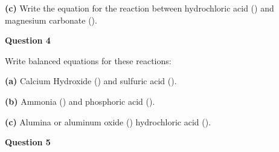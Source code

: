 \documentclass{article}
\begin{document}
{\begin{center}
\textbf{(c)} Write the equation for the reaction between hydrochloric acid () and magnesium carbonate ().

\vspace{0.8cm}
\begin{center}
\end{center}
\vspace{0.2cm}


\pagebreak
\vspace{0.2cm}
\hspace{1cm}
\textbf{Question 4} 
\vspace{0.2cm}

Write balanced equations for these reactions:
\vspace{0.2cm}

\textbf{(a)} Calcium Hydroxide () and sulfuric acid ().

\vspace{0.8cm}
\begin{center}
\end{center}
\vspace{0.2cm}

\textbf{(b)} Ammonia () and phosphoric acid ().

\vspace{0.8cm}
\begin{center}
\end{center}
\vspace{0.2cm}

\textbf{(c)} Alumina or aluminum oxide () hydrochloric acid ().

\vspace{0.8cm}
\begin{center}
\end{center}
\vspace{0.2cm}

\pagebreak
\vspace{0.2cm}
\hspace{1cm}
\textbf{Question 5} 
\vspace{0.2cm}


\end{center}}
\end{document}
